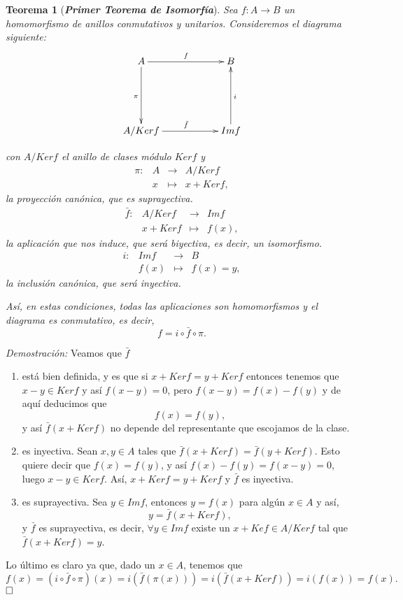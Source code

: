 \documentclass[12pt]{article}
\newtheorem{theorem}{Teorema}[section]
\begin{document}
\begin{theorem}[\textbf{\textit{Primer Teorema de Isomorfía}}]\label{eq:1ti} Sea $f \colon A \longrightarrow B$ un homomorfismo de anillos conmutativos y unitarios. Consideremos el diagrama siguiente:
$$\xymatrix @=2cm {A\ar[r]^{f} \ar[d]_\pi & B  \\ A/Ker f \ar[r]^{\bar{f}} & Im f \ar[u]_{i}  }$$

con $A/Ker f$ el anillo de clases módulo $Ker f$ y $$\begin{array}{rccl}
\pi \colon &A&\longrightarrow &A/Ker f \\
&x& \longmapsto &x + Ker f,
\end{array}
$$ 
la proyección canónica, que es suprayectiva.
$$\begin{array}{rccl}
\bar{f} \colon &A/Ker f&\longrightarrow &Im f \\
&x + Ker f& \longmapsto &f(x),
\end{array}
$$ 
la aplicación que nos induce, que será biyectiva, es decir, un isomorfismo.
$$\begin{array}{rccl}
i \colon &Im f&\longrightarrow &B \\
&f(x)& \longmapsto &f(x) =y,
\end{array}
$$ 
la inclusión canónica, que será inyectiva. 

Así, en estas condiciones, todas las aplicaciones son homomorfismos y el diagrama es conmutativo, es decir, $$f = i \circ \bar{f} \circ \pi.$$
\end{theorem}
\emph{Demostración: }Veamos que $\bar{f}$ \begin{enumerate}
\item está bien definida, y es que si $x + Ker f = y + Ker f$ entonces tenemos que $x-y \in Ker f$ y así $f(x-y) = 0$, pero $f(x-y)= f(x) -f(y)$ y de aquí deducimos que $$f(x) = f(y),$$ y así $\bar{f}(x + Kerf)$ no depende del representante que escojamos de la clase.
\item es inyectiva. Sean $x,y \in A$ tales que $\bar{f}(x + Kerf) = \bar{f}(y + Kerf)$. Esto quiere decir que $f(x) = f(y)$, y así $f(x) - f(y) = f(x-y) = 0$, luego $x-y \in Kerf$. Así, $x + Kerf = y + Kerf$ y $\bar{f}$ es inyectiva.
\item es suprayectiva. Sea $y \in Imf$, entonces $y = f(x)$ para algún $x \in A$ y así, $$y = \bar{f}(x + Kerf),$$ y $\bar{f}$ es suprayectiva, es decir, $\forall y \in Imf$ existe un $x + Kef \in A/Kerf$ tal que $\bar{f}(x + Kerf) = y$.
\end{enumerate}
Lo último es claro ya que, dado un $x \in A$, tenemos que $$f(x) = (i \circ \bar{f} \circ \pi) (x) = i(\bar{f}(\pi(x))) = i(\bar{f}(x + Kerf)) = i(f(x)) = f(x).$$
$\hfill \square$
\end{document}
